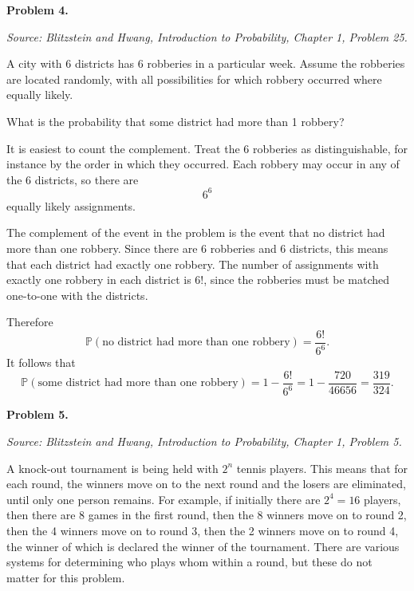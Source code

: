 \documentclass[11pt]{article}
\newcommand{\source}[1]{%
    \vspace{0.15cm}
    {\small\textit{Source: Blitzstein and Hwang, \textit{Introduction to Probability}, Chapter 1, Problem #1.}}
}
\begin{document}

\begin{problemheader}
\textbf{Problem 4. } \hfill 
\end{problemheader}
\source{25}

A city with 6 districts has 6 robberies in a particular week. Assume the robberies are located randomly, with all possibilities for which robbery occurred where equally likely.

What is the probability that some district had more than 1 robbery?

\begin{solutionbox}
It is easiest to count the complement. Treat the 6 robberies as distinguishable, for instance by the order in which they occurred. Each robbery may occur in any of the 6 districts, so there are
\[
6^6
\]
equally likely assignments.

The complement of the event in the problem is the event that no district had more than one robbery. Since there are 6 robberies and 6 districts, this means that each district had exactly one robbery. The number of assignments with exactly one robbery in each district is \(6!\), since the robberies must be matched one-to-one with the districts.

Therefore
\[
\mathbb{P}(\text{no district had more than one robbery})
=
\frac{6!}{6^6}.
\]
It follows that
\[
\mathbb{P}(\text{some district had more than one robbery})
=
1-\frac{6!}{6^6}
=
1-\frac{720}{46656}
=
\frac{319}{324}.
\]

\end{solutionbox}
\newpage


\begin{problemheader}
\textbf{Problem 5.} \hfill  
\end{problemheader}
\source{5}

A knock-out tournament is being held with $2^n$ tennis players. This means that for each round, the winners move on to the next round and the losers are eliminated, until only one person remains. For example, if initially there are $2^4=16$ players, then there are 8 games in the first round, then the 8 winners move on to round 2, then the 4 winners move on to round 3, then the 2 winners move on to round 4, the winner of which is declared the winner of the tournament. There are various systems for determining who plays whom within a round, but these do not matter for this problem.
\end{document}
